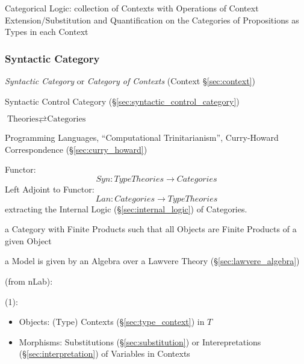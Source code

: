 Categorical Logic: collection of Contexts with Operations of Context
Extension/Substitution and Quantification on the Categories of
Propositions as Types in each Context



\subsubsection{Syntactic Category}\label{sec:syntactic_category}

\emph{Syntactic Category} or \emph{Category of Contexts} (Context
\S\ref{sec:context})

Syntactic Control Category (\S\ref{sec:syntactic_control_category})

$\text{Theories} \rightleftarrows \text{Categories}$

Programming Languages, ``Computational Trinitarianism'', Curry-Howard
Correspondence (\S\ref{sec:curry_howard})

Functor:
\[
  Syn : TypeTheories \rightarrow Categories
\]
Left Adjoint to Functor:
\[
  Lan : Categories \rightarrow TypeTheories
\]
extracting the Internal Logic (\S\ref{sec:internal_logic}) of
Categories.

a Category with Finite Products such
that all Objects are Finite Products of a given Object %

a Model is given by an Algebra over a Lawvere Theory
(\S\ref{sec:lawvere_algebra})


(from nLab):

(1):

\begin{itemize}
  \item Objects: (Type) Contexts (\S\ref{sec:type_context}) in $T$
  \item Morphisms: Substitutions (\S\ref{sec:substitution}) or
    Interepretations (\S\ref{sec:interpretation}) of Variables in
    Contexts
\end{itemize}

